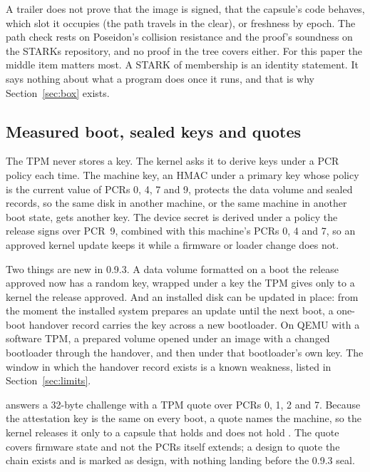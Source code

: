 A trailer does not prove that the image is signed, that the capsule's code behaves, which slot it occupies (the path travels in the clear), or freshness by epoch. The path check rests on Poseidon's collision resistance and the proof's soundness on the STARKs repository, and no proof in the tree covers either. For this paper the middle item matters most. A STARK of membership is an identity statement. It says nothing about what a program does once it runs, and that is why Section~\ref{sec:box} exists.

\subsection{Measured boot, sealed keys and quotes}

The TPM never stores a \nonos{} key. The kernel asks it to derive keys under a PCR policy each time. The machine key, an HMAC under a primary key whose policy is the current value of PCRs 0, 4, 7 and 9, protects the data volume and sealed records, so the same disk in another machine, or the same machine in another boot state, gets another key. The device secret is derived under a policy the release signs over PCR~9, combined with this machine's PCRs 0, 4 and 7, so an approved kernel update keeps it while a firmware or loader change does not.

Two things are new in 0.9.3. A data volume formatted on a boot the release approved now has a random key, wrapped under a key the TPM gives only to a kernel the release approved. And an installed disk can be updated in place: from the moment the installed system prepares an update until the next boot, a one-boot handover record carries the key across a new bootloader. On QEMU with a software TPM, a prepared volume opened under an image with a changed bootloader through the handover, and then under that bootloader's own key. The window in which the handover record exists is a known weakness, listed in Section~\ref{sec:limits}.

 answers a 32-byte challenge with a TPM quote over PCRs 0, 1, 2 and 7. Because the attestation key is the same on every boot, a quote names the machine, so the kernel releases it only to a capsule that holds  and does not hold . The quote covers firmware state and not the PCRs \nonos{} itself extends; a design to quote the \nonos{} chain exists and is marked as design, with nothing landing before the 0.9.3 seal.

